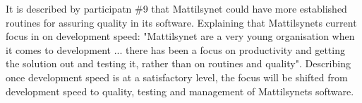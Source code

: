 It is described by participatn \#9 that Mattilsynet could have more established routines for assuring quality in its software. Explaining that Mattilsynets current focus in on development speed: "Mattilsynet are a very young organisation when it comes to development ... there has been a focus on productivity and getting the solution out and testing it, rather than on routines and quality". Describing once development speed is at a satisfactory level, the focus will be shifted from development speed to quality, testing and management of Mattilsynets software.








